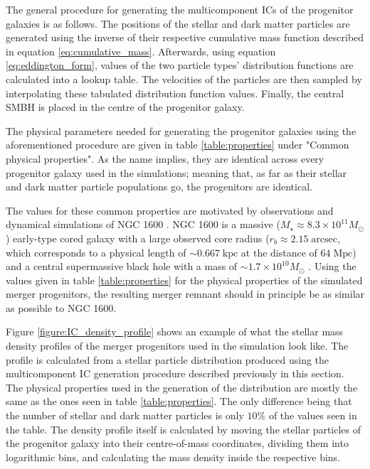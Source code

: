 \documentclass[english, oneside]{HYgradu}
\begin{document}
The general procedure for generating the multicomponent ICs of the progenitor galaxies is as follows. The positions of the stellar and dark matter particles are generated using the inverse of their respective cumulative mass function described in equation \ref{eq:cumulative_mass}. Afterwards, using equation \ref{eq:eddington_form}, values of the two particle types' distribution functions are calculated into a lookup table. The velocities of the particles are then sampled by interpolating these tabulated distribution function values. Finally, the central SMBH is placed in the centre of the progenitor galaxy.

The physical parameters needed for generating the progenitor galaxies using the aforementioned procedure are given in table \ref{table:properties} under "Common physical properties". As the name implies, they are identical across every progenitor galaxy used in the simulations; meaning that, as far as their stellar and dark matter particle populations go, the progenitors are identical. 

The values for these common properties are motivated by observations and dynamical simulations of NGC 1600 \citep{Rantala2018}. NGC 1600 is a massive ($M_\star \approx 8.3 \times 10^{11} M_\odot$) early-type cored galaxy with a large observed core radius ($r_b \approx 2.15 \; \mathrm{arcsec}$, which corresponds to a physical length of $\sim 0.667 \; \mathrm{kpc}$ at the distance of $64 \; \mathrm{Mpc}$) and a central supermassive black hole with a mass of $\sim 1.7 \times 10^{10} M_\odot$ \citep{Thomas2016}. Using the values given in table \ref{table:properties} for the physical properties of the simulated merger progenitors, the resulting merger remnant should in principle be as similar as possible to NGC 1600.

Figure \ref{figure:IC_density_profile} shows an example of what the stellar mass density profiles of the merger progenitors used in the simulation look like. The profile is calculated from a stellar particle distribution produced using the multicomponent IC generation procedure described previously in this section. The physical properties used in the generation of the distribution are mostly the same as the ones seen in table \ref{table:properties}. The only difference being that the number of stellar and dark matter particles is only $10 \%$  of the values seen in the table. The density profile itself is calculated by moving the stellar particles of the progenitor galaxy into their centre-of-mass coordinates, dividing them into logarithmic bins, and calculating the mass density inside the respective bins.
\end{document}
